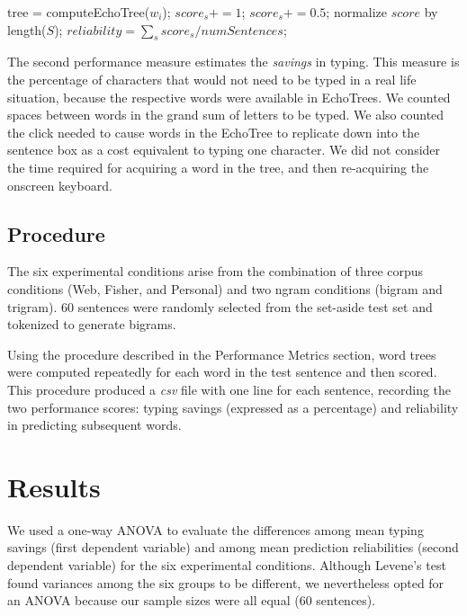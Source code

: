 \documentclass{sigchi}
\begin{document}
\begin{algorithmic}
        \STATE tree = computeEchoTree($w_i$);
            \STATE $score_s += 1$;
            \STATE $score_s += 0.5$;
        \ENDIF
     \ENDFOR
     \STATE normalize $score$ by length($S$);
  \ENDFOR
  \STATE $reliability = \sum_s score_s / numSentences$;
\end{algorithmic}            

The second performance measure estimates the {\em savings} in
typing. This measure is the percentage of characters that would not
need to be typed in a real life situation, because the respective
words were available in EchoTrees. We counted spaces between words in
the grand sum of letters to be typed. We also counted the click needed to
cause words in the EchoTree to replicate down into the sentence box as
a cost equivalent to typing one character. We did not consider the
time required for acquiring a word in the tree, and then re-acquiring
the onscreen keyboard.

\subsection{Procedure}
The six experimental conditions arise from the combination of three corpus conditions (Web, Fisher, and Personal) and two ngram conditions (bigram and trigram). 60 sentences were randomly selected from the set-aside test set and tokenized to generate bigrams. 

Using the procedure described in the Performance Metrics section, word trees were computed repeatedly for each word in the test sentence and then scored. This procedure produced a {\em csv} file with one line for each sentence, recording the two performance scores: typing savings (expressed as a percentage) and reliability in predicting subsequent words.

\section{Results}
We used a one-way ANOVA to evaluate the differences among mean typing savings (first dependent variable) and among mean prediction reliabilities (second dependent variable) for the six experimental conditions. Although Levene’s test found variances among the six groups to be different, we nevertheless opted for an ANOVA because our sample sizes were all equal (60 sentences).
\end{document}
